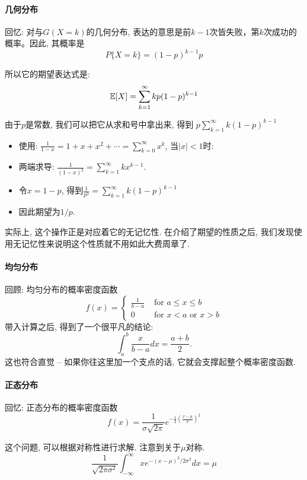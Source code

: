 \paragraph{几何分布}
回忆: 对与$G(X=k)$的几何分布, 表达的意思是前$k-1$次皆失败，第$k$次成功的概率。因此, 其概率是
    $$
    P\{X=k\}=(1-p)^{k-1} p
    $$

    所以它的期望表达式是: 
    $$
    \mathbb E[X]=\sum_{k=1}^{\infty} k p(1-p)^{k-1}
    $$

    由于$p$是常数, 我们可以把它从求和号中拿出来, 得到
    $p \sum_{k=1}^{\infty} k(1-p)^{k-1}$


\begin{itemize}
    \item 使用: $\frac{1}{1-x}  =1+x+x^2+\cdots =\sum_{k=0}^{\infty} x^k$, 当$|x|<1$时: 
    \item 两端求导: $\frac{1}{(1-x)^2}=\sum_{k=1}^{\infty} k x^{k-1}$.
    \item 令$x=1-p$, 得到$\frac{1}{p^2}=\sum_{k=1}^{\infty} k(1-p)^{k-1}$
    \item 因此期望为$1/p$.
\end{itemize}

实际上, 这个操作正是对应着它的无记忆性. 在介绍了期望的性质之后, 我们发现使用无记忆性来说明这个性质就不用如此大费周章了. 

\paragraph{均匀分布} 回顾: 均匀分布的概率密度函数$$
f(x)= \begin{cases}\frac{1}{b-a} & \text { for } a \leq x \leq b \\ 0 & \text { for } x<a \text { or } x>b\end{cases}
$$
带入计算之后, 得到了一个很平凡的结论: $$\int_a^b \frac{x}{b-a} d x=\frac{a+b}{2}.$$
这也符合直觉 -- 如果你往这里加一个支点的话, 它就会支撑起整个概率密度函数. 

\paragraph{正态分布}
回忆: 正态分布的概率密度函数$$
    f(x)=\frac{1}{\sigma \sqrt{2 \pi}} e^{-\frac{1}{2}\left(\frac{x-\mu}{\sigma}\right)^2}
    $$

    这个问题, 可以根据对称性进行求解. 注意到关于$\mu$对称.  
    $$
\frac{1}{\sqrt{2 \pi \sigma^2}} \int_{-\infty}^{\infty} x e^{-(x-\mu)^2 / 2 \sigma^2} d x=\mu
$$


